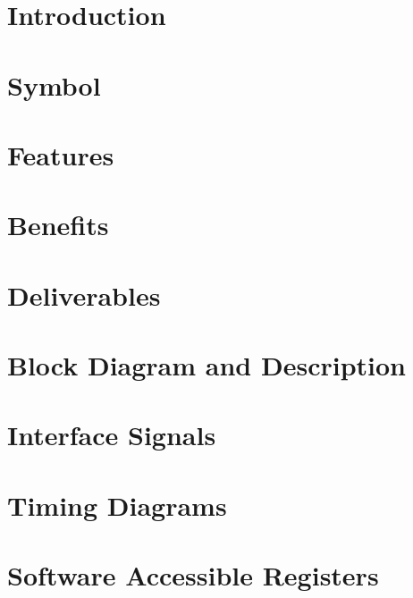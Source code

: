 \documentclass{\TEX/ug/ug}
\begin{document}
\maketitle
\cleardoublepage
\tableofcontents
\listoftables
\listoffigures
\cleardoublepage

\section{Introduction}
\label{sec:intro}


\section{Symbol}
\label{sec:symb}


\section{Features}
\label{sec:feat}


\section{Benefits}
\label{sec:benef}


\section{Deliverables}
\label{sec:deliv}


\section{Block Diagram and Description}
\label{sec:bdd}


\section{Interface Signals}
\label{sec:ifsig}


\ifdefined\TD
\section{Timing Diagrams}
\label{sec:td}

\fi

\ifdefined\SWREG
\section{Software Accessible Registers}
\label{sec:swreg}

\fi
\end{document}
